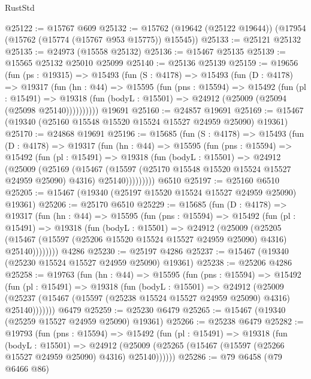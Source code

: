 \begin{lexlean}{RustStd}
\begin{coremodule}
@25122 := @15767 @609
@25132 := @15762 (@19642 (@25122 @19644)) (@17954 (@15762 (@15774 (@15767 @953 @15775)) @15545))
@25133 := @25121 @25132
@25135 := @24973 (@15558 @25132)
@25136 := @15467 @25135
@25139 := @15565 @25132 @25010 @25099
@25140 := @25136 @25139
@25159 := @19656
    (fun (ps : @19315) =>
    @15493
      (fun (S : @4178) =>
      @15493
        (fun (D : @4178) =>
        @19317
          (fun (hn : @44) =>
          @15595
            (fun (pns : @15594) =>
            @15492
              (fun (pl : @15491) =>
              @19318 (fun (bodyL : @15501) => @24912 (@25009 (@25094 (@25098 @25140))))))))))
    @19691
@25160 := @24857 @19691
@25169 := @15467 (@19340 (@25160 @15548 @15520 @15524 @15527 @24959 @25090) @19361)
@25170 := @24868 @19691
@25196 := @15685
    (fun (S : @4178) =>
    @15493
      (fun (D : @4178) =>
      @19317
        (fun (hn : @44) =>
        @15595
          (fun (pns : @15594) =>
          @15492
            (fun (pl : @15491) =>
            @19318
              (fun (bodyL : @15501) =>
              @24912
                (@25009
                  (@25169
                    (@15467
                      (@15597 (@25170 @15548 @15520 @15524 @15527 @24959 @25090) @4316)
                      @25140)))))))))
    @6510
@25197 := @25160 @6510
@25205 := @15467 (@19340 (@25197 @15520 @15524 @15527 @24959 @25090) @19361)
@25206 := @25170 @6510
@25229 := @15685
    (fun (D : @4178) =>
    @19317
      (fun (hn : @44) =>
      @15595
        (fun (pns : @15594) =>
        @15492
          (fun (pl : @15491) =>
          @19318
            (fun (bodyL : @15501) =>
            @24912
              (@25009
                (@25205
                  (@15467 (@15597 (@25206 @15520 @15524 @15527 @24959 @25090) @4316) @25140))))))))
    @4286
@25230 := @25197 @4286
@25237 := @15467 (@19340 (@25230 @15524 @15527 @24959 @25090) @19361)
@25238 := @25206 @4286
@25258 := @19763
    (fun (hn : @44) =>
    @15595
      (fun (pns : @15594) =>
      @15492
        (fun (pl : @15491) =>
        @19318
          (fun (bodyL : @15501) =>
          @24912
            (@25009
              (@25237 (@15467 (@15597 (@25238 @15524 @15527 @24959 @25090) @4316) @25140)))))))
    @6479
@25259 := @25230 @6479
@25265 := @15467 (@19340 (@25259 @15527 @24959 @25090) @19361)
@25266 := @25238 @6479
@25282 := @19793
    (fun (pns : @15594) =>
    @15492
      (fun (pl : @15491) =>
      @19318
        (fun (bodyL : @15501) =>
        @24912 (@25009 (@25265 (@15467 (@15597 (@25266 @15527 @24959 @25090) @4316) @25140))))))
@25286 := @79 @6458 (@79 @6466 @86)

\end{coremodule}
\end{lexlean}
